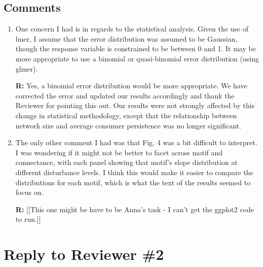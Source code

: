 \documentclass[12pt]{article}
\begin{document}
    \subsection*{Comments}

        \begin{enumerate}

            \item One concern I had is in regards to the statistical analysis. Given the use of lmer, I assume that the error distribution was assumed to be Gaussian, though the response variable is constrained to be between 0 and 1. It may be more appropriate to use a binomial or quasi-binomial error distribution (using glmer).

            \textbf{R:} Yes, a binomial error distribution would be more appropriate. We have corrected the error and updated our results accordingly and thank the Reviewer for pointing this out. Our results were not strongly affected by this change in statistical methodology, except that the relationship between network size and average consumer persistence was no longer significant.

            \item The only other comment I had was that Fig. 4 was a bit difficult to interpret. I was wondering if it might not be better to facet across motif and connectance, with each panel showing that motif's slope distribution at different disturbance levels. I think this would make it easier to compare the distributions for each motif, which is what the text of the results seemed to focus on.

            \textbf{R:} [[This one might be have to be Anna's task - I can't get the ggplot2 code to run.]]

        \end{enumerate}

\clearpage

\section*{Reply to Reviewer \#2}
\end{document}
